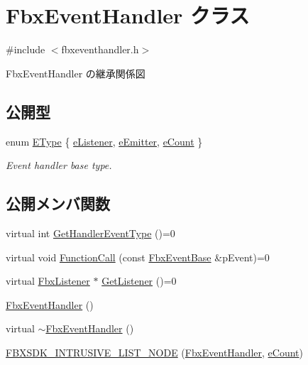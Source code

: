 \hypertarget{class_fbx_event_handler}{}\section{Fbx\+Event\+Handler クラス}
\label{class_fbx_event_handler}


{\ttfamily \#include $<$fbxeventhandler.\+h$>$}



Fbx\+Event\+Handler の継承関係図
\subsection*{公開型}
\begin{DoxyCompactItemize}
\item 
enum \hyperlink{class_fbx_event_handler_a47139da2cfd5abee91664d75c4fb577c}{E\+Type} \{ \hyperlink{class_fbx_event_handler_a47139da2cfd5abee91664d75c4fb577ca288df77e1147943ca82bc3a7d8bc493b}{e\+Listener}, 
\hyperlink{class_fbx_event_handler_a47139da2cfd5abee91664d75c4fb577cae2c0d7da494cef8d787ee3495e24a6c0}{e\+Emitter}, 
\hyperlink{class_fbx_event_handler_a47139da2cfd5abee91664d75c4fb577ca2c6941dcdf691c32251fae0beabeadb2}{e\+Count}
 \}\begin{DoxyCompactList}\small\item\em Event handler base type. \end{DoxyCompactList}
\end{DoxyCompactItemize}
\subsection*{公開メンバ関数}
\begin{DoxyCompactItemize}
\item 
virtual int \hyperlink{class_fbx_event_handler_a0b42d2b93e63d866975f468a481c9f3c}{Get\+Handler\+Event\+Type} ()=0
\item 
virtual void \hyperlink{class_fbx_event_handler_a46357ba45116a30c8f53c3e5fe9ba2fb}{Function\+Call} (const \hyperlink{class_fbx_event_base}{Fbx\+Event\+Base} \&p\+Event)=0
\item 
virtual \hyperlink{class_fbx_listener}{Fbx\+Listener} $\ast$ \hyperlink{class_fbx_event_handler_a6d496102fe1253372bb042840c2d45a7}{Get\+Listener} ()=0
\item 
\hyperlink{class_fbx_event_handler_a275484070d5de1b461c6cca690f74e29}{Fbx\+Event\+Handler} ()
\item 
virtual \hyperlink{class_fbx_event_handler_a2b420c30f76ba3ed1c9b9937c4964293}{$\sim$\+Fbx\+Event\+Handler} ()
\item 
\hyperlink{class_fbx_event_handler_a5f41da1b9002da90f4681d9efe6d4542}{F\+B\+X\+S\+D\+K\+\_\+\+I\+N\+T\+R\+U\+S\+I\+V\+E\+\_\+\+L\+I\+S\+T\+\_\+\+N\+O\+DE} (\hyperlink{class_fbx_event_handler}{Fbx\+Event\+Handler}, \hyperlink{class_fbx_event_handler_a47139da2cfd5abee91664d75c4fb577ca2c6941dcdf691c32251fae0beabeadb2}{e\+Count})
\end{DoxyCompactItemize}


